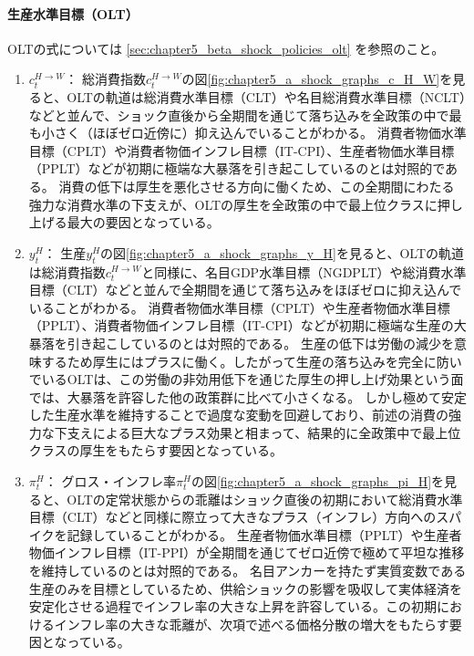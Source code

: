 \paragraph{生産水準目標（OLT）}
\label{sec:chapter5_a_shock_policies_olt}
OLTの式については
\ref{sec:chapter5_beta_shock_policies_olt}
を参照のこと。
\begin{enumerate}
    \item
    \label{itm:chapter5_a_shock_policies_olt_c_H_W}
        \(c_t^{H\to W}\)：
        総消費指数\(c_t^{H\to W}\)の図\ref{fig:chapter5_a_shock_graphs_c_H_W}を見ると、OLTの軌道は総消費水準目標（CLT）や名目総消費水準目標（NCLT）などと並んで、ショック直後から全期間を通じて落ち込みを全政策の中で最も小さく（ほぼゼロ近傍に）抑え込んでいることがわかる。
        消費者物価水準目標（CPLT）や消費者物価インフレ目標（IT-CPI）、生産者物価水準目標（PPLT）などが初期に極端な大暴落を引き起こしているのとは対照的である。
        消費の低下は厚生を悪化させる方向に働くため、この全期間にわたる強力な消費水準の下支えが、OLTの厚生を全政策の中で最上位クラスに押し上げる最大の要因となっている。
    \item
    \label{itm:chapter5_a_shock_policies_olt_y_H}
        \(y_t^H\)：
        生産\(y_t^H\)の図\ref{fig:chapter5_a_shock_graphs_y_H}を見ると、OLTの軌道は総消費指数\(c_t^{H\to W}\)と同様に、名目GDP水準目標（NGDPLT）や総消費水準目標（CLT）などと並んで全期間を通じて落ち込みをほぼゼロに抑え込んでいることがわかる。
        消費者物価水準目標（CPLT）や生産者物価水準目標（PPLT）、消費者物価インフレ目標（IT-CPI）などが初期に極端な生産の大暴落を引き起こしているのとは対照的である。
        生産の低下は労働の減少を意味するため厚生にはプラスに働く。したがって生産の落ち込みを完全に防いでいるOLTは、この労働の非効用低下を通じた厚生の押し上げ効果という面では、大暴落を許容した他の政策群に比べて小さくなる。
        しかし極めて安定した生産水準を維持することで過度な変動を回避しており、前述の消費の強力な下支えによる巨大なプラス効果と相まって、結果的に全政策中で最上位クラスの厚生をもたらす要因となっている。
    \item
    \label{itm:chapter5_a_shock_policies_olt_pi_H}
        \(\pi_t^H\)：
        グロス・インフレ率\(\pi_t^H\)の図\ref{fig:chapter5_a_shock_graphs_pi_H}を見ると、OLTの定常状態からの乖離はショック直後の初期において総消費水準目標（CLT）などと同様に際立って大きなプラス（インフレ）方向へのスパイクを記録していることがわかる。
        生産者物価水準目標（PPLT）や生産者物価インフレ目標（IT-PPI）が全期間を通じてゼロ近傍で極めて平坦な推移を維持しているのとは対照的である。
        名目アンカーを持たず実質変数である生産のみを目標としているため、供給ショックの影響を吸収して実体経済を安定化させる過程でインフレ率の大きな上昇を許容している。この初期におけるインフレ率の大きな乖離が、次項で述べる価格分散の増大をもたらす要因となっている。

\end{enumerate}

